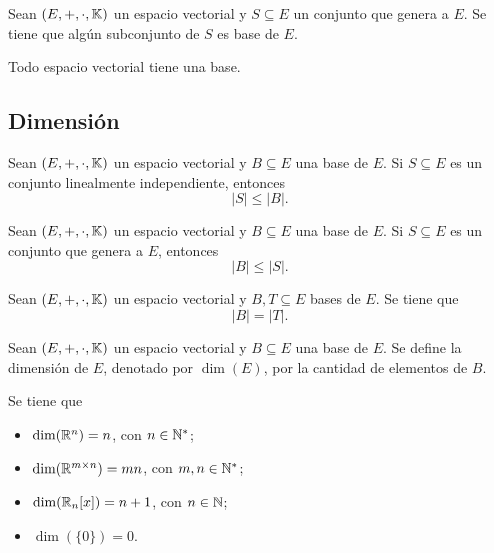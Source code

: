 \documentclass[a4,11pt]{aleph-notas}
\begin{document}
\begin{teo}
    Sean $(E,+,\cdot,\K)$ un espacio vectorial y $S\subseteq E$ un conjunto que genera a $E$. Se tiene que algún subconjunto de $S$ es base de $E$.
\end{teo}


\begin{teo}
    Todo espacio vectorial tiene una base.
\end{teo}

\subsection{Dimensión}


\begin{teo}
    Sean $(E,+,\cdot,\K)$ un espacio vectorial y $B\subseteq E$ una base de $E$. Si $S\subseteq E$ es un conjunto linealmente independiente, entonces 
    \[
        |S|\leq |B|.
    \]
\end{teo}

\begin{teo}
    Sean $(E,+,\cdot,\K)$ un espacio vectorial y $B\subseteq E$ una base de $E$. Si $S\subseteq E$ es un conjunto que genera a $E$, entonces 
    \[
        |B|\leq |S|.
    \]
\end{teo}


\begin{teo}
    Sean $(E,+,\cdot,\K)$ un espacio vectorial y $B,T\subseteq E$ bases de $E$. Se tiene que
    \[
        |B|=|T|.
    \]
\end{teo}

\begin{defi}[Dimensión]
    Sean $(E,+,\cdot,\K)$ un espacio vectorial y $B\subseteq E$ una base de $E$. Se define la dimensión de $E$, denotado por $\dim(E)$, por la cantidad de elementos de $B$.
\end{defi}

\begin{teo}
    Se tiene que
    \begin{itemize}
    \item
        $\dim(\R^n)=n$, con $n\in \N^*$;
    \item
        $\dim(\Mat[\R]{m}{n})=mn$, con $m,n\in \N^*$;
    \item
        $\dim(\R_n[x])=n+1$, con $n\in \N$;
    \item
        $\dim(\{0\}) = 0$.
    \end{itemize}
\end{teo}
\end{document}
